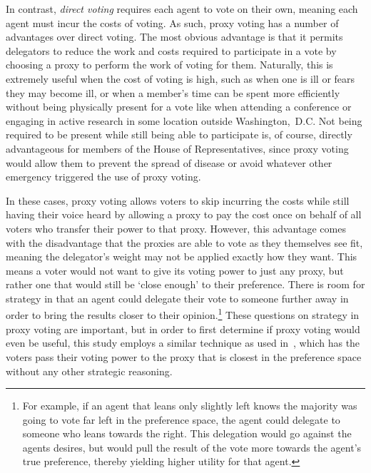 In contrast, \textit{direct voting} requires each agent to vote on their own, meaning
each agent must incur the costs of voting.
As such, proxy voting has a number of advantages over direct voting.
The most obvious advantage is that it permits delegators to reduce the work and costs
required to participate in a vote by choosing a proxy to perform the work of voting
for them.
Naturally, this is extremely useful when the cost of voting is high, such as
when one is ill or fears they may become ill, or when a member's time can be spent
more efficiently without being physically present for a vote like when attending a
conference or engaging in active research in some location outside {Washington,~D.C}.
Not being required to be present while still being able to participate is, of course,
directly advantageous for members of the House of Representatives, since proxy voting
would allow them to prevent the spread of disease or avoid whatever other emergency
triggered the use of proxy voting.

In these cases, proxy voting allows voters to skip incurring the costs while still
having their voice heard by allowing a proxy to pay the cost once on behalf of all
voters who transfer their power to that proxy.
However, this advantage comes with the disadvantage that the proxies are able to vote
as they themselves see fit, meaning the delegator's weight may not be applied exactly
how they want.
This means a voter would not want to give its voting power to just any proxy, but
rather one that would still be `close enough' to their preference.
There is room for strategy in that an agent could delegate their vote to someone
further away in order to bring the results closer to their opinion.\footnote{
    For example, if an agent that leans only slightly left knows the majority was going
    to vote far left in the preference space, the agent could delegate to someone who
    leans towards the right.
    This delegation would go against the agents desires, but would pull the result of
    the vote more towards the agent's true preference, thereby yielding higher
    utility for that agent.
}
These questions on strategy in proxy voting are important, but in order to first
determine if proxy voting would even be useful, this study employs a similar technique
as used in~\cite{Cohensius2017}, which has the voters pass their voting power to the
proxy that is closest in the preference space without any other strategic reasoning.

